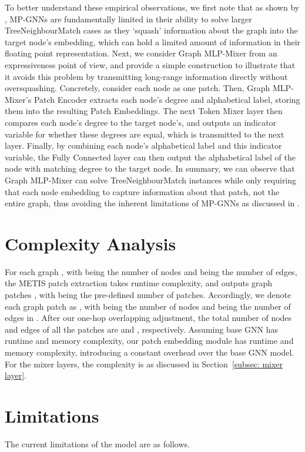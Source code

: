 \documentclass{article}
\begin{document}
To better understand these empirical observations, we first note that as shown by \citet{alon2020bottleneck}, MP-GNNs are fundamentally limited in their ability to solve larger TreeNeighbourMatch cases as they `squash' information about the graph into the target node's embedding, which can hold a limited amount of information in their floating point representation. Next, we consider Graph MLP-Mixer from an expressiveness point of view, and provide a simple construction to illustrate that it avoids this problem by transmitting long-range information directly without oversquashing. Concretely, consider each node as one patch. Then, Graph MLP-Mixer's Patch Encoder extracts each node's degree and alphabetical label, storing them into the resulting Patch Embeddings. The next Token Mixer layer then compares each node's degree to the target node's, and outputs an indicator variable for whether these degrees are equal, which is transmitted to the next layer. Finally, by combining each node's alphabetical label and this indicator variable, the Fully Connected layer can then output the alphabetical label of the node with matching degree to the target node. In summary, we can observe that Graph MLP-Mixer can solve TreeNeighbourMatch instances while only requiring that each node embedding to capture information about that patch, not the entire graph, thus avoiding the inherent limitations of MP-GNNs as discussed in \citep{alon2020bottleneck}.



\section{Complexity Analysis}\label{sec: complexity}
For each graph , with  being the number of nodes and  being the number of edges, the METIS patch extraction takes  runtime complexity, and outputs graph patches , with  being the pre-defined number of patches. Accordingly, we denote each graph patch as , with  being the number of nodes and  being the number of edges in .
After our one-hop overlapping adjustment, the total number of nodes and edges of all the patches are  and , respectively. Assuming base GNN has  runtime and memory complexity, our patch embedding module has  runtime and memory complexity, introducing a constant overhead over the base GNN model. For the mixer layers, the complexity is  as discussed in Section~\ref{subsec: mixer layer}.




\section{Limitations}\label{app sec: limitation}
The current limitations of the model are as follows.
\end{document}
